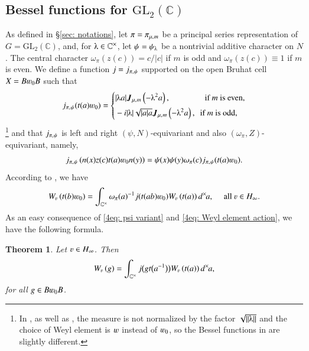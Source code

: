 \documentclass{amsproc}
\newcommand{\BC}{{\mathbb {C}}} \newcommand{\BD}{{\mathbb {D}}}
\newcommand{\GL}{{\mathrm {GL}}} \newcommand{\PGL}{{\mathrm {PGL}}}
\def\-{^{-1}}
\def\lp {\left (}
\def\rp {\right )}
\def\BCx{\BC^{\times}}
\def\bfJ {\boldsymbol J}
\def\shskip{\hskip 0.5 pt}
\def\dx{d^{\times} \hskip -1 pt}
\theoremstyle{plain}
\newtheorem{thm}{Theorem}[section] \newtheorem{cor}[thm]{Corollary}
\numberwithin{equation}{section}
\begin{document}
	\subsection{Bessel functions for $\GL_2 (\BC)$}\label{sec: Bessel, GL2}
	As defined in \S \ref{sec: notations}, let $\pi = \pi_{\mu, \shskip  m}$ be a principal series representation of $G = \GL_2 (\BC)$, and, for $\lambdaup \in \BCx$, let $\psi = \psi_{\lambdaup} $ be a nontrivial additive character on $N$. The central character $\omega_{\pi} (z (c)) = c /|c|$ if $m$ is odd and $ \omega_{\pi} (z (c)) \equiv 1$ if $m$ is even. We define a function $j = j_{\pi, \shskip \psi}$ supported on the open Bruhat cell $X = B \varw_0 B$ such that
	\begin{equation}\label{4eq : j = J}
	j_{\pi, \shskip \psi} ( t(a) \varw_0 ) = \left\{
	\begin{split}
	& |\lambdaup a| \bfJ_{ \mu,\shskip   m} \lp - \lambdaup^2 a \rp,  \hskip 42 pt \text {if } m \text{ is even},\\
	&  - i |\lambdaup| {\textstyle \sqrt {    |a| a}} \bfJ_{ \mu,\shskip   m} \lp - \lambdaup^2 a \rp,  \hskip 5 pt \text {if }  m \text{ is odd},
	\end{split}
	\right.
	\end{equation}
	 \footnote{In \cite{Qi-Bessel}, as well as  \cite{CPS}, the measure  is not normalized by the factor $\sqrt {\|\lambdaup\|}$ and   the choice of   Weyl element  is $\varw$ instead of $\varw_0$, so the Bessel functions in \cite[Proposition 18.5]{Qi-Bessel} are slightly different.} and that $j_{\pi, \shskip \psi}$ is left and right $  (\psi, N)$-equivariant and also $(\omega_{\pi}, Z)$-equivariant, namely,
		\begin{align}\label{4eq: psi variant}
		j_{\pi, \shskip \psi} \lp n(x)z(c) t(a) \varw_0 n(y) \rp = \psi (x) \psi (y) \omega_{\pi} (c ) j_{\pi, \shskip \psi} ( t(a) \varw_0 ).
		\end{align}
		According to \cite[\S 18]{Qi-Bessel}, we have
	\begin{equation}\label{4eq: Weyl element action}
	W_{\varv} \lp
	t (b)
	\varw_0 \rp
	=  \int_{\BCx } \omega_\pi (  a  )\-  j ( t(ab) \varw_0) W_{\varv} \lp
	t (a)
	\rp \dx  a, \hskip 10 pt \text{ all }  \varv \in H_{\infty}.
	\end{equation}
As an easy consequence of \eqref{4eq: psi variant} and \eqref{4eq: Weyl element action}, we have the following formula.
	
	\begin{thm}\label{thm: W(g) on BwB}
		Let $\varv \in H_{\infty}$. Then
		\begin{align}
		W_{\varv} \lp
		g \rp
		=  \int_{\BCx } j \big( g t \big( a\- \big) \big)  W_{\varv} \lp
		t (a)
		\rp \dx  a,
		\end{align}
		for all $ g  \in B \varw_0 B$.
	\end{thm}
	
\end{document}
